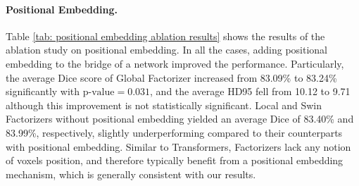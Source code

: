 \documentclass[a4,12pt]{article}
\begin{document}
	\paragraph{Positional Embedding.} 
	Table \ref{tab: positional embedding ablation results} shows the results of the ablation study on positional embedding. In all the cases, adding positional embedding to the bridge of a network improved the performance. Particularly, the average Dice score of Global Factorizer increased from 83.09\% to 83.24\% significantly with $ \text{p-value} = 0.031 $, and the average HD95 fell from 10.12 to 9.71 although this improvement is not statistically significant. Local and Swin Factorizers without positional embedding yielded an average Dice of 83.40\% and 83.99\%, respectively, slightly underperforming compared to their counterparts with positional embedding. Similar to Transformers, Factorizers lack any notion of voxels position, and therefore typically benefit from a positional embedding mechanism, which is generally consistent with our results. 
	
	
	
\end{document}
